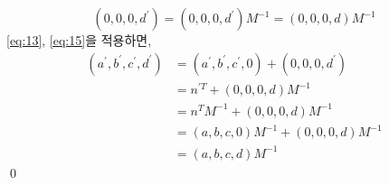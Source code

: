 \documentclass{article}
\begin{document}
\begin{solution}
\begin{equation}
	(0,0,0,d^\prime) = (0,0,0,d^\prime) M^{-1} = (0,0,0,d) M^{-1} \label{eq:15}
\end{equation}
\eqref{eq:13}, \eqref{eq:15}을 적용하면,
\begin{equation}\begin{aligned}
	(a^\prime, b^\prime, c^\prime, d^\prime) &= (a^\prime, b^\prime, c^\prime, 0) + (0, 0, 0, d^\prime)\\
	&= n^{\prime T} + (0,0,0,d) M^{-1}\\
	&= n^T M^{-1} + (0,0,0,d) M^{-1}\\
	&= (a,b,c,0) M^{-1} + (0,0,0,d) M^{-1} \\
	&= (a,b,c,d) M^{-1}
\end{aligned}\end{equation}\qed
\end{solution}
\end{document}

